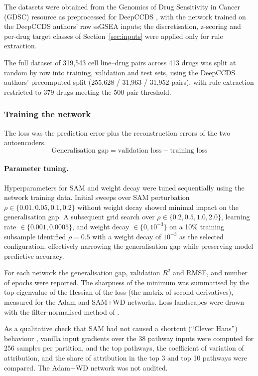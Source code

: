 The datasets were obtained from the Genomics of Drug Sensitivity in Cancer (GDSC) resource \citep{yang2013} as preprocessed for DeepCCDS \citep{wu2025}, with the network trained on the DeepCCDS authors' raw ssGSEA inputs; the discretisation, z-scoring and per-drug target classes of Section~\ref{sec:inputs} were applied only for rule extraction.

The full dataset of 319,543 cell line--drug pairs across 413 drugs was split at random by row into training, validation and test sets, using the DeepCCDS authors' precomputed split (255,628 / 31,963 / 31,952 pairs), with rule extraction restricted to 379 drugs meeting the 500-pair threshold.

\subsubsection{Training the network}
\label{sec:training}

The loss was the prediction error plus the reconstruction errors of the two autoencoders.
\[
  \text{Generalisation gap} = \text{validation loss} - \text{training loss}
\]

\paragraph{Parameter tuning.}
Hyperparameters for SAM and weight decay were tuned sequentially using the network training data. Initial sweeps over SAM perturbation $\rho \in \{0.01, 0.05, 0.1, 0.2\}$ without weight decay showed minimal impact on the generalisation gap. A subsequent grid search over $\rho \in \{0.2, 0.5, 1.0, 2.0\}$, learning rate $\in \{0.001, 0.0005\}$, and weight decay $\in \{0, 10^{-3}\}$ on a 10\% training subsample identified $\rho = 0.5$ with a weight decay of $10^{-3}$ as the selected configuration, effectively narrowing the generalisation gap while preserving model predictive accuracy.

For each network the generalisation gap, validation $R^2$ and RMSE, and number of epochs were reported. The sharpness of the minimum was summarised by the top eigenvalue of the Hessian of the loss (the matrix of second derivatives), measured for the Adam and SAM+WD networks. Loss landscapes were drawn with the filter-normalised method of \citet{li2018}.

As a qualitative check that SAM had not caused a shortcut (``Clever Hans'') behaviour \citep{lapuschkin2019}, vanilla input gradients over the 38 pathway inputs were computed for 256 samples per partition, and the top pathways, the coefficient of variation of attribution, and the share of attribution in the top 3 and top 10 pathways were compared. The Adam+WD network was not audited.

